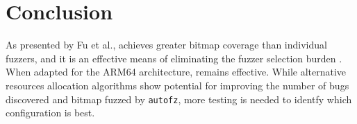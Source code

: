 \section{Conclusion}
As presented by Fu et al.,  achieves greater bitmap coverage than individual 
fuzzers, and it is an effective means of eliminating the fuzzer selection burden \cite{fu_autofz_2023}. 
When adapted for the ARM64 architecture,  remains effective. 
While alternative resources allocation algorithms show potential for improving the number of bugs discovered
and bitmap fuzzed by \texttt{autofz}, more testing is needed to identfy which configuration is best.